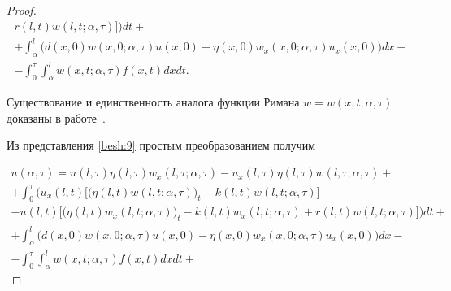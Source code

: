 \begin{proof}
\begin{multline}
r(l,t)w(l,t;\alpha,\tau)\Big]\Big)dt+

\\

+\int^{l}_\alpha\Big(d(x, 0)w(x, 0;\alpha,\tau)u(x, 0)-\eta(x, 0)w_{x}(x, 0;\alpha,\tau)u_{x}(x, 0)

\Big)dx-

\\

-\int^{\tau}_0 \int^l_{\alpha}w(x,t;\alpha,\tau)f(x,t)dxdt.

\label{besh:9}

\end{multline}


Существование и единственность аналога функции Римана $w=w(x,t;\alpha,\tau)$ доказаны в работе~\cite{besh:bib:Shhanukov}.



Из представления \eqref{besh:9} простым преобразованием получим

\begin{multline}

u(\alpha,\tau) = u(l,\tau)\eta(l,\tau)w_{x}(l,\tau;\alpha,\tau)

-u_{x}(l,\tau)\eta(l,\tau)w(l,\tau;\alpha,\tau) + 

\\

+\int^{\tau}_0\Big(

u_{x}(l,t)\big[\big(\eta(l,t)w(l,t;\alpha,\tau)\big)_{t}-

k(l,t)w(l,t;\alpha,\tau)\big]-

\\

-u(l,t)

\Big[\big(\eta(l,t)w_{x}(l,t;\alpha,\tau)\big)_{t}

-k(l,t)w_{x}(l,t;\alpha,\tau)+ 

r(l,t)w(l,t;\alpha,\tau)\Big]\Big)dt+

\\

+\int^{l}_\alpha\Big(d(x, 0)

w(x, 0;\alpha,\tau)u(x, 0)-\eta(x, 0)w_{x}(x, 0;\alpha,\tau)u_{x}(x, 0)

\Big)dx-

\\

-\int^{\tau}_0 \int^l_{\alpha}w(x,t;\alpha,\tau)f(x,t)dxdt+


\end{multline}
\end{proof}
